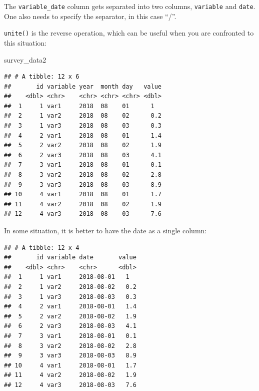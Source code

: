 \documentclass[]{gitbook}
\newenvironment{Shaded}{\begin{snugshade}}{\end{snugshade}}
\newcommand{\DataTypeTok}[1]{\textcolor[rgb]{0.13,0.29,0.53}{#1}}
\newcommand{\KeywordTok}[1]{\textcolor[rgb]{0.13,0.29,0.53}{\textbf{#1}}}
\newcommand{\NormalTok}[1]{#1}
\newcommand{\OperatorTok}[1]{\textcolor[rgb]{0.81,0.36,0.00}{\textbf{#1}}}
\newcommand{\StringTok}[1]{\textcolor[rgb]{0.31,0.60,0.02}{#1}}
\theoremstyle{definition}
\theoremstyle{definition}
\theoremstyle{definition}
\theoremstyle{remark}
\begin{document}
The \texttt{variable\_date} column gets separated into two columns,
\texttt{variable} and \texttt{date}. One also needs to specify the
separator, in this case ``/''.

\texttt{unite()} is the reverse operation, which can be useful when you
are confronted to this situation:

\begin{Shaded}
\begin{Highlighting}[]
\NormalTok{survey_data2}
\end{Highlighting}
\end{Shaded}

\begin{verbatim}
## # A tibble: 12 x 6
##       id variable year  month day   value
##    <dbl> <chr>    <chr> <chr> <chr> <dbl>
##  1     1 var1     2018  08    01      1  
##  2     1 var2     2018  08    02      0.2
##  3     1 var3     2018  08    03      0.3
##  4     2 var1     2018  08    01      1.4
##  5     2 var2     2018  08    02      1.9
##  6     2 var3     2018  08    03      4.1
##  7     3 var1     2018  08    01      0.1
##  8     3 var2     2018  08    02      2.8
##  9     3 var3     2018  08    03      8.9
## 10     4 var1     2018  08    01      1.7
## 11     4 var2     2018  08    02      1.9
## 12     4 var3     2018  08    03      7.6
\end{verbatim}

In some situation, it is better to have the date as a single column:

\begin{Shaded}
\end{Shaded}

\begin{verbatim}
## # A tibble: 12 x 4
##       id variable date       value
##    <dbl> <chr>    <chr>      <dbl>
##  1     1 var1     2018-08-01   1  
##  2     1 var2     2018-08-02   0.2
##  3     1 var3     2018-08-03   0.3
##  4     2 var1     2018-08-01   1.4
##  5     2 var2     2018-08-02   1.9
##  6     2 var3     2018-08-03   4.1
##  7     3 var1     2018-08-01   0.1
##  8     3 var2     2018-08-02   2.8
##  9     3 var3     2018-08-03   8.9
## 10     4 var1     2018-08-01   1.7
## 11     4 var2     2018-08-02   1.9
## 12     4 var3     2018-08-03   7.6
\end{verbatim}
\end{document}
